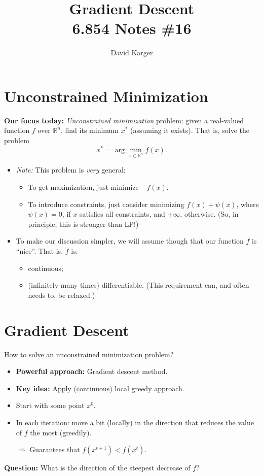 \documentclass{article}
\title{Gradient Descent\\ 6.854 Notes \#16}
\author{David Karger}
\newcommand{\RR}{\mathbb{R}}
\begin{document}
\section{Unconstrained Minimization}
{\bf Our focus today:} {\em Unconstrained minimization} problem: given a real-valued function $f$ over $\RR^n$, find its minimum $x^*$ (assuming it exists). That is, solve the problem
\[
x^*=\arg\min_{x\in \RR^n} f(x).
\]
\begin{itemize}
\item {\em Note:} This problem is {\em very} general:
\begin{itemize}
\item To get maximization, just minimize $-f(x)$. 
\item To introduce constraints, just consider minimizing $f(x)+\psi(x)$, where $\psi(x)=0$, if $x$ satisfies all constraints, and $+\infty$, otherwise. (So, in principle, this is stronger than LP!)
\end{itemize}
\item To make our discussion simpler, we will assume though that our function $f$ is ``nice''. That is, $f$ is:
\begin{itemize}
\item continuous;
\item (infinitely many times) differentiable. (This requirement can, and often needs to, be relaxed.)
\end{itemize}
\end{itemize}

\section{Gradient Descent}

How to solve an unconstrained minimization problem?
\begin{itemize}
\item {\bf Powerful approach:} Gradient descent method.
\item {\bf Key idea:} Apply (continuous) local greedy approach. 
\item Start with some point $x^0$.
\item In each iteration: move a bit (locally) in the direction that reduces the value of $f$ the most (greedily).

$\Rightarrow$ Guarantees that $f(x^{t+1})<f(x^t)$.
\end{itemize}

{\bf Question:} What is the direction of the steepest decrease of $f$?
\end{document}
